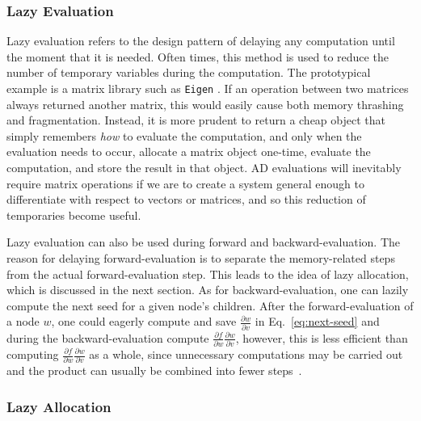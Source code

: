 \subsubsection{Lazy Evaluation}\label{sssec:lazy-eval}

Lazy evaluation refers to the design pattern of delaying any computation until the moment that it is needed.
Often times, this method is used to reduce the number of temporary variables during the computation.
The prototypical example is a matrix library such as \verb|Eigen| .
If an operation between two matrices always returned another matrix, 
this would easily cause both memory thrashing and fragmentation.
Instead, it is more prudent to return a cheap object that simply remembers \emph{how} to evaluate the computation,
and only when the evaluation needs to occur, allocate a matrix object one-time, 
evaluate the computation, and store the result in that object.
AD evaluations will inevitably require matrix operations if we are to create a system
general enough to differentiate with respect to vectors or matrices,
and so this reduction of temporaries become useful.

Lazy evaluation can also be used during forward and backward-evaluation.
The reason for delaying forward-evaluation is to separate
the memory-related steps from the actual forward-evaluation step.
This leads to the idea of lazy allocation, which is discussed in the next section.
As for backward-evaluation, one can lazily compute the next seed for a given node's children.
After the forward-evaluation of a node $w$, 
one could eagerly compute and save $\frac{\partial w}{\partial v}$
in Eq.~\ref{eq:next-seed} and during the backward-evaluation 
compute $\frac{\partial f}{\partial w} \frac{\partial w}{\partial v}$,
however, this is less efficient than 
computing $\frac{\partial f}{\partial w} \frac{\partial w}{\partial v}$ as a whole,
since unnecessary computations may be carried out
and the product can usually be combined into fewer steps~\cite{carpenter:2015}.

\subsubsection{Lazy Allocation}\label{sssec:lazy-alloc}

